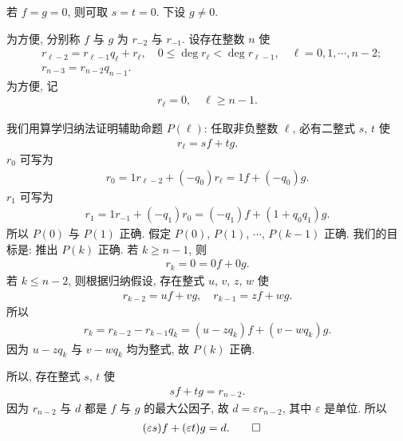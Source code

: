\begin{pf}
    若 $f=g=0$, 则可取 $s=t=0$. 下设 $g \neq 0$.

    为方便, 分别称 $f$ 与 $g$ 为 $r_{-2}$ 与 $r_{-1}$. 设存在整数 $n$ 使
    \begin{align*}
         & r_{\ell - 2} = r_{\ell - 1} q_{\ell} + r_{\ell}, \quad 0 \leq \deg r_{\ell} < \deg r_{\ell - 1}, \quad \ell = 0,1,\cdots,n-2; \\
         & r_{n - 3} = r_{n - 2} q_{n - 1}.
    \end{align*}
    为方便, 记
    \begin{align*}
        r_{\ell} = 0, \quad \ell \geq n - 1.
    \end{align*}

    我们用算学归纳法证明辅助命题 $P(\ell)$: 任取非负整数 $\ell$, 必有二整式 $s$, $t$ 使
    \begin{align*}
        r_\ell = sf + tg.
    \end{align*}
    $r_0$ 可写为
    \begin{align*}
        r_0 = 1 r_{\ell - 2} + (-q_0) r_{\ell} = 1f + (-q_0)g.
    \end{align*}
    $r_1$ 可写为
    \begin{align*}
        r_1 = 1r_{-1} + (-q_1) r_0 = (-q_1) f + (1 + q_0 q_1) g.
    \end{align*}
    所以 $P(0)$ 与 $P(1)$ 正确. 假定 $P(0)$, $P(1)$, $\cdots$, $P(k-1)$ 正确. 我们的目标是: 推出 $P(k)$ 正确. 若 $k \geq n-1$, 则
    \begin{align*}
        r_k = 0 = 0f + 0g.
    \end{align*}
    若 $k \leq n-2$, 则根据归纳假设, 存在整式 $u$, $v$, $z$, $w$ 使
    \begin{align*}
        r_{k-2} = uf + vg, \quad r_{k-1} = zf + wg.
    \end{align*}
    所以
    \begin{align*}
        r_{k} = r_{k-2} - r_{k-1} q_k = (u - zq_k) f + (v - wq_k) g.
    \end{align*}
    因为 $u - zq_k$ 与 $v - wq_k$ 均为整式, 故 $P(k)$ 正确.

    所以, 存在整式 $s$, $t$ 使
    \begin{align*}
        sf + tg = r_{n-2}.
    \end{align*}
    因为 $r_{n-2}$ 与 $d$ 都是 $f$ 与 $g$ 的最大公因子, 故 $d = \varepsilon r_{n-2}$, 其中 $\varepsilon$ 是单位. 所以
    \begin{align*}
         & (\varepsilon s)f + (\varepsilon t)g = d. \qedhere
    \end{align*}
\end{pf}

